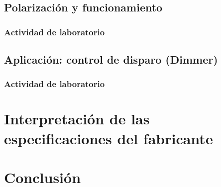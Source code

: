 \documentclass[chaptersright]{informeutn}
\begin{document}
\section{Polarización y funcionamiento}
\subsection{Actividad de laboratorio}
\section{Aplicación: control de disparo (Dimmer)}
\subsection{Actividad de laboratorio}

\chapter{Interpretación de las especificaciones del fabricante}

\chapter{Conclusión}
\end{document}

